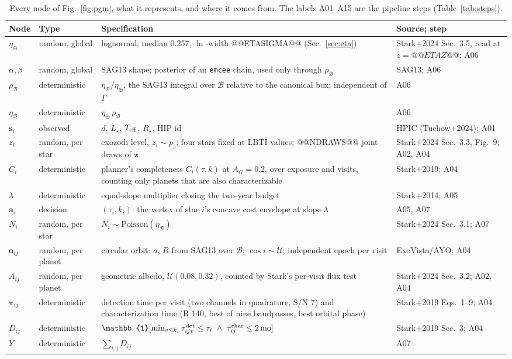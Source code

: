 \documentclass[11pt,a4paper]{article}
\begin{document}
\begin{table}[htbp]
\centering
\scriptsize
\begin{tabular}{p{1.2cm}p{3.2cm}p{5.6cm}p{3.6cm}}
\toprule
\textbf{Node} & \textbf{Type} & \textbf{Specification} & \textbf{Source; step} \\
\midrule
$\eta_\oplus$ & random, global & lognormal, median 0.257, $\ln$-width @@ETASIGMA@@ (Sec.~\ref{sec:eta}) & Stark+2024 Sec.~3.5, read at $z=@@ETAZ@@$; A06 \\
$\alpha,\beta$ & random, global & SAG13 shape; posterior of an \texttt{emcee} chain, used only through $\rho_\mathcal{B}$ & SAG13; A06 \\
$\rho_\mathcal{B}$ & deterministic & $\eta_\mathcal{B}/\eta_\oplus$, the SAG13 integral over $\mathcal{B}$ relative to the canonical box; independent of $\Gamma$ & A06 \\
$\eta_\mathcal{B}$ & deterministic & $\eta_\oplus\,\rho_\mathcal{B}$ & A06 \\
$\mathbf{s}_i$ & observed & $d$, $L_\star$, $T_{\rm eff}$, $R_\star$, HIP id & HPIC (Tuchow+2024); A01 \\
$z_i$ & random, per star & exozodi level, $z_i \sim p_z$; four stars fixed at LBTI values; @@NDRAWS@@ joint draws of $\mathbf{z}$ & Stark+2024 Sec.~3.3, Fig.~9; A02, A04 \\
$C_i$ & deterministic & planner's completeness $C_i(\tau, k)$ at $A_G = 0.2$, over exposure and visits, counting only planets that are also characterizable & Stark+2019; A04 \\
$\lambda$ & deterministic & equal-slope multiplier closing the two-year budget & Stark+2014; A05 \\
$\mathbf{a}_i$ & decision & $(\tau_i, k_i)$: the vertex of star $i$'s concave cost envelope at slope $\lambda$ & A05, A07 \\
$N_i$ & random, per star & $N_i \sim \mathrm{Poisson}(\eta_\mathcal{B})$ & Stark+2024 Sec.~3.1; A07 \\
$\mathbf{o}_{ij}$ & random, per planet & circular orbit: $a$, $R$ from SAG13 over $\mathcal{B}$; $\cos i \sim \mathcal{U}$; independent epoch per visit & ExoVista/AYO; A04 \\
$A_{ij}$ & random, per planet & geometric albedo, $\mathcal{U}(0.08, 0.32)$, counted by Stark's per-visit flux test & Stark+2024 Sec.~3.2; A02, A04 \\
$\boldsymbol{\tau}_{ij}$ & deterministic & detection time per visit (two channels in quadrature, S/N 7) and characterization time (R 140, best of nine bandpasses, best orbital phase) & Stark+2019 Eqs.~1--9; A04 \\
$D_{ij}$ & deterministic & $\mathbb{1}[\min_{v \le k_i}\tau^{\rm det}_{ijv} \le \tau_i \ \wedge\ \tau^{\rm char}_{ij} \le 2\,\mathrm{mo}]$ & Stark+2019 Sec.~3; A04 \\
$Y$ & deterministic & $\sum_{i,j} D_{ij}$ & A07 \\
\bottomrule
\end{tabular}
\caption{Every node of Fig.~\ref{fig:pgm}, what it represents, and where it comes from. The
labels A01--A15 are the pipeline steps (Table~\ref{tab:steps}).}
\label{tab:nodes}
\end{table}
\end{document}
